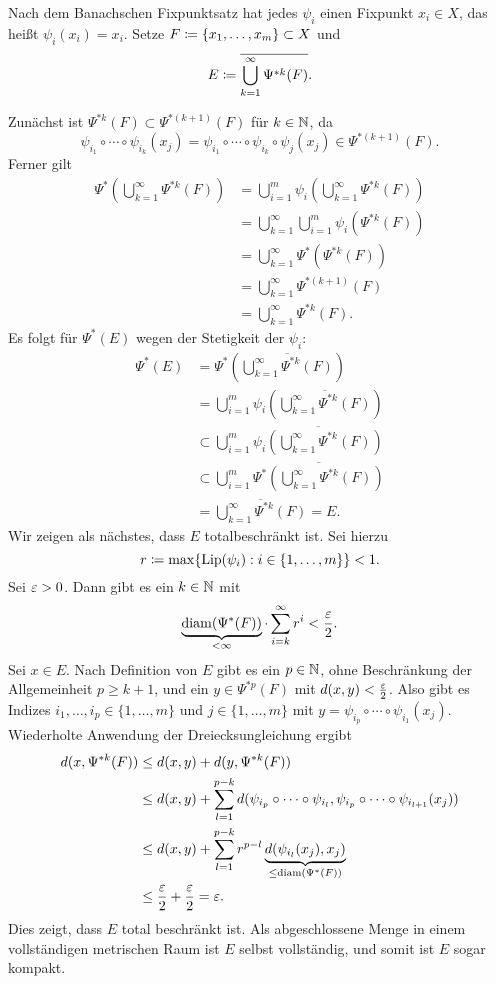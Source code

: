 \documentclass[a4paper,twoside,DIV15,BCOR12mm]{scrbook}
\DeclareMathOperator{\diam}{diam}
\DeclareMathOperator{\Lip}{Lip}
\begin{document}
\begin{beweis}
Nach dem Banachschen Fixpunktsatz hat jedes $\psi_i$ einen Fixpunkt $x_i\in X$, das heißt $\psi_i(x_i) = x_i$. Setze $F \da \{x_1,\ldots,x_m\}\subset X$ und
\[
E\da\overline{\bigcup_{k=1}^\infty \Psi^{*k}(F)}.
\]

Zunächst ist $\Psi^{*k}(F)\subset \Psi^{*(k+1)}(F)$ für $k\in \mathbb{N}$, da 
\[
\psi_{i_1}\circ \cdots \circ \psi_{i_k}(x_j) = \psi_{i_1}\circ \cdots\circ \psi_{i_k}\circ \psi_j (x_j) \in \Psi^{*(k+1)}(F).
\]
Ferner gilt 
\begin{align*}
\Psi^*(\bigcup_{k=1}^\infty \Psi^{*k}(F))
&= \bigcup_{i=1}^m \psi_i(\bigcup_{k=1}^\infty \Psi^{*k}(F))\\
&= \bigcup_{k=1}^\infty \bigcup_{i=1}^m \psi_i(\Psi^{*k}(F))\\
&= \bigcup_{k=1}^\infty \Psi^*(\Psi^{*k}(F))\\
&= \bigcup_{k=1}^\infty \Psi^{*(k+1)}(F) \\
&= \bigcup_{k=1}^\infty \Psi^{*k}(F).
\end{align*}
Es folgt für $\Psi^*(E)$ wegen der Stetigkeit der $\psi_i$:
\begin{align*}
\Psi^*(E)
& =\Psi^*\left(\overline{\bigcup_{k=1}^\infty \Psi^{*k}(F)}\right)\\
&= \bigcup_{i=1}^m\psi_i\left(\overline{\bigcup_{k=1}^\infty \Psi^{*k}(F)}\right) \\
&\subset \bigcup_{i=1}^m\overline{\psi_i\left(\bigcup_{k=1}^\infty \Psi^{*k}(F)\right)} \\
&\subset \bigcup_{i=1}^m\overline{\Psi^*\left(\bigcup_{k=1}^\infty \Psi^{*k}(F)\right)} \\
&= \overline{\bigcup_{k=1}^\infty \Psi^{*k}(F)} = E.
\end{align*}
Wir zeigen als nächstes, dass $E$ totalbeschränkt ist. Sei hierzu
\[
r\da \max\{\Lip(\psi_i): i\in\{1,\ldots,m\}\} < 1.
\]
Sei $\varepsilon>0$. Dann gibt es ein $k\in \mathbb{N}$ mit
\[
\underbrace{\diam(\Psi^*(F))}_{<\infty} \cdot \sum_{i=k}^\infty r^i < \frac\ep2.
\]
Sei $x\in E$. Nach Definition von $E$ gibt es ein $p\in\mathbb{N}$, ohne Beschränkung der Allgemeinheit $p\ge k+1$, und ein $y\in\Psi^{*p}(F)$ mit $d(x,y)<\frac{\varepsilon}2$. Also gibt es Indizes $i_1,\ldots,i_p\in \{1,\ldots,m\}$ und $j\in\{1,\ldots,m\}$ mit $y = \psi_{i_p}\circ\cdots\circ\psi_{i_1}(x_j)$. Wiederholte Anwendung der Dreiecksungleichung ergibt
\begin{align*}
d(x,\Psi^{*k}(F))
&\le d(x,y) + d(y,\Psi^{*k}(F))\\
&\le d(x,y) + \sum _{l=1}^{p-k} d(\psi_{i_p}\circ \cdots \circ \psi_{i_l}, \psi_{i_p} \circ \cdots\circ \psi_{i_{l+1}}(x_j))\\
&\le d(x,y) + \sum_{l=1}^{p-k} r^{p-l} \underbrace{d(\psi_{i_l}(x_j), x_j)}_{\le \diam(\Psi^*(F))}\\
&\le \frac\ep2 + \frac\ep2 = \ep .
\end{align*}
Dies zeigt, dass $E$ total beschränkt ist. Als abgeschlossene Menge in einem vollständigen metrischen Raum 
ist $E$ selbst vollständig, und somit ist $E$ sogar kompakt.


\end{beweis}
\end{document}
